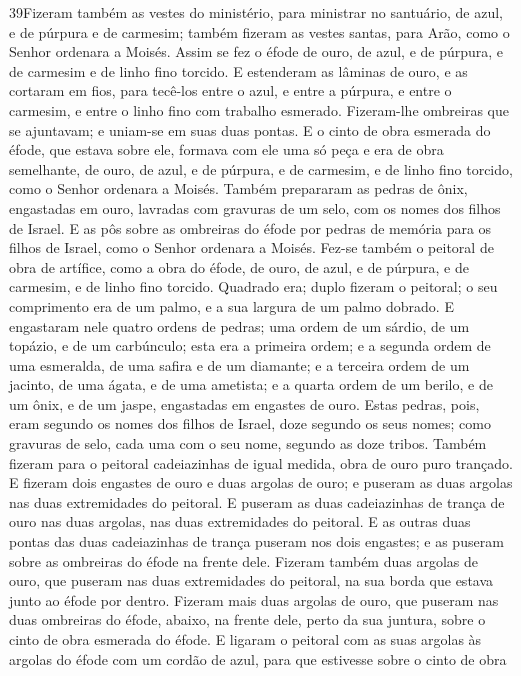 \lettrine{39} Fizeram também as vestes do ministério, para
ministrar no santuário, de azul, e de púrpura e de carmesim; também
fizeram as vestes santas, para Arão, como o Senhor ordenara a
Moisés. Assim se fez o éfode de ouro, de azul, e de púrpura, e
de carmesim e de linho fino torcido. E estenderam as lâminas de
ouro, e as cortaram em fios, para tecê-los entre o azul, e entre a
púrpura, e entre o carmesim, e entre o linho fino com trabalho
esmerado. Fizeram-lhe ombreiras que se ajuntavam; e uniam-se em
suas duas pontas. E o cinto de obra esmerada do éfode, que
estava sobre ele, formava com ele uma só peça e era de obra
semelhante, de ouro, de azul, e de púrpura, e de carmesim, e de
linho fino torcido, como o Senhor ordenara a Moisés. Também
prepararam as pedras de ônix, engastadas em ouro, lavradas com
gravuras de um selo, com os nomes dos filhos de Israel. E as pôs
sobre as ombreiras do éfode por pedras de memória para os filhos de
Israel, como o Senhor ordenara a Moisés. Fez-se também o
peitoral de obra de artífice, como a obra do éfode, de ouro, de
azul, e de púrpura, e de carmesim, e de linho fino torcido.
Quadrado era; duplo fizeram o peitoral; o seu comprimento era de
um palmo, e a sua largura de um palmo dobrado. E engastaram
nele quatro ordens de pedras; uma ordem de um sárdio, de um topázio,
e de um carbúnculo; esta era a primeira ordem; e a segunda
ordem de uma esmeralda, de uma safira e de um diamante; e a
terceira ordem de um jacinto, de uma ágata, e de uma ametista;
e a quarta ordem de um berilo, e de um ônix, e de um jaspe,
engastadas em engastes de ouro. Estas pedras, pois, eram
segundo os nomes dos filhos de Israel, doze segundo os seus nomes;
como gravuras de selo, cada uma com o seu nome, segundo as doze
tribos. Também fizeram para o peitoral cadeiazinhas de igual
medida, obra de ouro puro trançado. E fizeram dois engastes
de ouro e duas argolas de ouro; e puseram as duas argolas nas duas
extremidades do peitoral. E puseram as duas cadeiazinhas de
trança de ouro nas duas argolas, nas duas extremidades do peitoral.
E as outras duas pontas das duas cadeiazinhas de trança
puseram nos dois engastes; e as puseram sobre as ombreiras do éfode
na frente dele. Fizeram também duas argolas de ouro, que
puseram nas duas extremidades do peitoral, na sua borda que estava
junto ao éfode por dentro. Fizeram mais duas argolas de ouro,
que puseram nas duas ombreiras do éfode, abaixo, na frente dele,
perto da sua juntura, sobre o cinto de obra esmerada do éfode.
E ligaram o peitoral com as suas argolas às argolas do éfode
com um cordão de azul, para que estivesse sobre o cinto de obra
